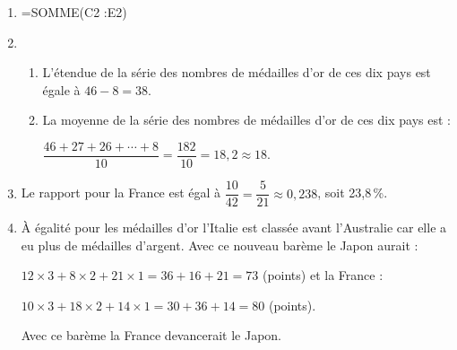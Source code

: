 \begin{enumerate}
\item %
=SOMME(C2 :\:E2)
\item  %
	\begin{enumerate}
		\item %
L'étendue de la série des nombres de médailles d'or de ces dix pays est égale à $46 - 8 = 38$.
		\item %
La moyenne de la série des nombres de médailles d'or de ces dix pays est :
		
$\dfrac{46 + 27 + 26 + \cdots + 8}{10} = \dfrac{182}{10} = 18,2 \approx 18$.
 	\end{enumerate}
\item  %
Le rapport pour la France est égal à $\dfrac{10}{42} = \dfrac{5}{21} \approx 0,238$, soit 23,8\,\%.
\item  %
À égalité pour les médailles d'or l'Italie est classée avant l'Australie car elle a eu plus de médailles d'argent.
Avec ce nouveau barème le Japon aurait :

$12 \times 3 + 8 \times 2 + 21 \times 1 = 36 + 16 + 21 = 73$ (points) et la France :

$10 \times 3 + 18 \times 2 + 14 \times 1 = 30 + 36 + 14 = 80$ (points).

Avec ce barème la France devancerait le Japon.
\end{enumerate}

\vspace{0,5cm}

